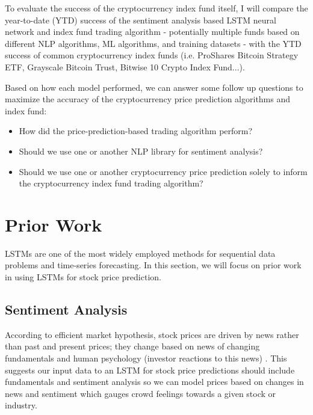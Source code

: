 \documentclass[10pt,twocolumn]{article}
\begin{document}
To evaluate the success of the cryptocurrency index fund itself, I will compare the year-to-date (YTD) success of the sentiment analysis based LSTM neural network and index fund trading algorithm - potentially multiple funds based on different NLP algorithms, ML algorithms, and training datasets - with the YTD success of common cryptocurrency index funds (i.e. ProShares Bitcoin Strategy ETF, Grayscale Bitcoin Trust, Bitwise 10 Crypto Index Fund...).

Based on how each model performed, we can answer some follow up questions to maximize the accuracy of the cryptocurrency price prediction algorithms and index fund:

\begin{itemize}
    \item How did the price-prediction-based trading algorithm perform?
    \item Should we use one or another NLP library for sentiment analysis?
    \item Should we use one or another cryptocurrency price prediction solely to inform the cryptocurrency index fund trading algorithm?
\end{itemize}

\section{Prior Work}

LSTMs are one of the most widely employed methods for sequential data problems and time-series forecasting. In this section, we will focus on prior work in using LSTMs for stock price prediction.

\subsection{Sentiment Analysis}

According to efficient market hypothesis, stock prices are driven by news rather than past and present prices; they change based on news of changing fundamentals and human psychology (investor reactions to this news) \cite{LSTMSentimentAnalysis}. This suggests our input data to an LSTM for stock price predictions should include fundamentals and sentiment analysis so we can model prices based on changes in news and sentiment which gauges crowd feelings towards a given stock or industry.
\end{document}
